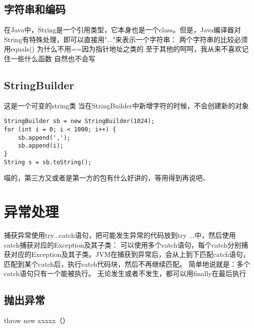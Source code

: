 \documentclass[a4paper,12pt]{ctexbook}
\begin{document}
\subsection{字符串和编码}
在Java中，String是一个引用类型，它本身也是一个class。但是，Java编译器对String有特殊处理，即可以直接用"..."来表示一个字符串：
两个字符串的比较必须用equals() 为什么不用==因为指针地址之类的
至于其他的呵呵，我从来不喜欢记住一些什么函数 自然也不会写
\subsection{StringBuilder}
这是一个可变的string类 当在StringBuilder中新增字符的时候，不会创建新的对象
\begin{lstlisting}
StringBuilder sb = new StringBuilder(1024);
for (int i = 0; i < 1000; i++) {
    sb.append(',');
    sb.append(i);
}
String s = sb.toString();
\end{lstlisting}
喵的，第三方又或者是第一方的包有什么好讲的，等用得到再说吧、
\section{异常处理}
捕获异常使用try...catch语句，把可能发生异常的代码放到try {...}中，然后使用catch捕获对应的Exception及其子类：
可以使用多个catch语句，每个catch分别捕获对应的Exception及其子类。JVM在捕获到异常后，会从上到下匹配catch语句，匹配到某个catch后，执行catch代码块，然后不再继续匹配。
简单地说就是：多个catch语句只有一个能被执行。
无论发生或者不发生，都可以用finally在最后执行
\subsection{抛出异常}
throw new xxxxx（）
\end{document}
